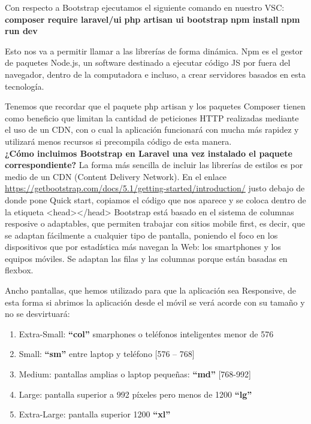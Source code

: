 \documentclass{article}
\begin{document}
Con respecto a Bootstrap ejecutamos el siguiente comando en nuestro VSC: 
\textbf{composer require laravel/ui}
\textbf{php artisan ui bootstrap}
\textbf{npm install}
\textbf{npm run dev}

Esto nos va a permitir llamar a las librerías de forma dinámica. 
Npm es el gestor de paquetes Node.js, un software destinado a ejecutar código JS por fuera del navegador, dentro de la computadora e incluso, a crear servidores basados en esta tecnología.

Tenemos que recordar que el paquete php artisan y los paquetes Composer tienen como beneficio que limitan la cantidad de peticiones HTTP realizadas mediante el uso de un CDN, con o cual la aplicación funcionará con mucha más rapidez y utilizará menos recursos si precompila código de esta manera.\\

\textbf{¿Cómo incluimos Bootstrap en Laravel una vez instalado el paquete correspondiente?}
La forma más sencilla de incluir las librerías de estilos es por medio de un CDN (Content Delivery Network).
En el enlace \url{https://getbootstrap.com/docs/5.1/getting-started/introduction/} justo debajo de donde pone Quick start, copiamos el código que nos aparece y se coloca dentro de la etiqueta <head></head>
Bootstrap está basado en el sistema de columnas resposive o adaptables, que permiten trabajar con sitios mobile first, es decir, que se adaptan fácilmente a cualquier tipo de pantalla, poniendo el foco en los dispositivos que por estadística más navegan la Web: los smartphones y los equipos móviles. Se adaptan las filas y las columnas porque están basadas en flexbox.

Ancho pantallas, que hemos utilizado para que la aplicación sea Responsive, de esta forma si abrimos la aplicación desde el móvil se verá acorde con su tamaño y no se desvirtuará: 
\begin{enumerate}
    \item Extra-Small: \textbf{``col''} smarphones o teléfonos inteligentes menor de 576
    \item Small: \textbf{``sm''} entre laptop y teléfono [576 – 768]
    \item Medium: pantallas amplias o laptop pequeñas: \textbf{``md''} [768-992]
    \item Large: pantalla superior a 992 píxeles pero menos de 1200 \textbf{``lg''}
    \item Extra-Large: pantalla superior 1200 \textbf{``xl''}
\end{enumerate}
\end{document}
